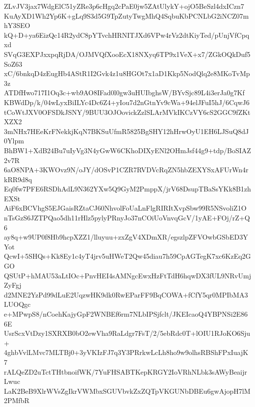 ZLvJV3jax7WdgElC51yZRe3p6cHgq2cPaE0jw5ZAtUlykY+ojO5BeSzl4dxICzn7
KuAyXD1Wh2Yp6K+gLq9S3d5G9TpZutyTwgMhQ4SqbuKbPCNLbG2iNCZ07mhY3SEO
kQ+D+ya6EizQc14R2ydC8pYTvchHRNITJXd6VPw4rVz2dtKiyTed/pUnjVfCpqxd
SVqG3EXPJxxpqRjDA/OJMVQfXooEcX18NXyq6TP9x1VeX+x7/ZGkOQkDuf5SoZ63
xC/6bnkqD4zEugHb4AStR1I2Gvk4z1u8HGOt7x1aD1Kkp5NodQlq2e8MKoTvMp3z
ATDfHwo717I1Oq3c+wb9AO8IFad0l0gw3uHUIbghsW/BYvSjc89L4i3erJa0g7Kf
KBWdDp/k/04wLyxBiILYc4Dc6Z4+yIou7d2nGtnYv9cWa+94elJFuI5hJ/6CqwJ6
tCoWtJXV0OFSDkJSNY/9BUU3OJOovickZzlSLArMVkIKCzVY6cS2GGC9fZKtXZX2
3mNHx7HEeKrFNekkjKqN7BKSuUfmR5825BgSHY12hHrwOyU1EH6LJSuQ8dJ0Ylpm
BhBW1+XdB24Bu7uIyVg3N4yGwW6CKhoDIXyENl2OHmJsf44g9+tdp/BoSIAZ2v7R
6aO8NPA+3KWOvz9N/oJY/dOSvP1CZR7RVDVcRqZN5hbZEXYSxAFUrWn4rkRR9d8q
Eq0fw7PFE6RSDhAdL9N362YXw5Q9GyM2PmppX/jrV68DsupTBaSsYKk8B1zhEXSt
AiF6xBCVhgS5EJGaisRZtaCJ60NhvolFoUaLnFlgRIRItXvpSbw99R5NSvoliZ1O
nTsGzS6JZTPQao5dh11rHlz5pylyPRnyJo37nCOiUoVnvqGcV/1yAE+FOj/rZ+Q6
ay8q+w9UP0f8Hb9hcpXZZ1/lluyuu+zxZgV4XDmXR/egszlpZFVOwbGSbED3YYot
QcwI+5SHQs+Kk8Ey1c4yT4jrv5uHWeT2Qw45diau7h59CpAGTegK7xc6KzEq2GGO
QSUtP+hMAU53aLtIOc+PnvHEI4sAMNgcEwxHzFtTdH6hqwDX3fUL9NRvUmjZyFgj
d2MNE2YzPd99dLuE2UqzwHK9dk0RwEParFF9BqCOWA+fCfY5qr0MPIbMA3LUOQgc
e+MPwpS8/nCoehKajyGpF2WNBEf6rm7NLbIPSjfclt/JKEIcaoQ4YBPNSi2E866E
UsrScxVtDzy1SXRXB0bO2ewVha9RaLdgr7FsT/2/5ebRdc0T+lOIU1RJoKO6Sju+
4ghbVvlLMvc7MLTBj0+3yVKIzFJ7q3Y3PRrkwLcLh8ho9w9olhsRBShFPxIuajK7
rALQeZD2uTctTHtbnoifWK/7YuFHSABTKepKRGY2IoVRhNLbk3sAWyBeaijrLwuc
LaK2BeB9XlrWVsZgIkrVWMbxSGUVbvkZxZQTpVKGUNbDBEu6gwAjopH7lM2PMfbR
